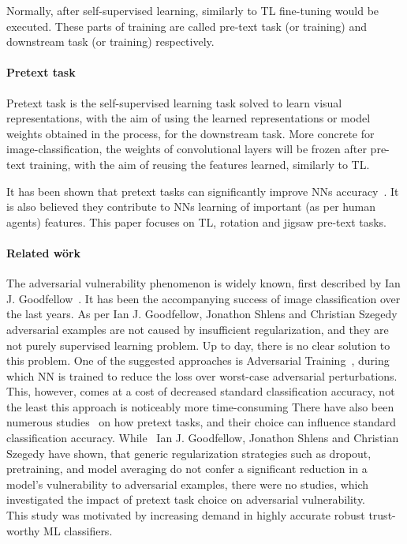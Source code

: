 Normally, after self-supervised learning, similarly to TL fine-tuning would be executed.
These parts of training are called pre-text task (or training) and downstream task (or training) respectively.

\paragraph{Pretext task}
Pretext task is the self-supervised learning task solved to learn visual representations,
with the aim of using the learned representations or model weights obtained in the process, for the downstream task.
More concrete for image-classification, the weights of convolutional layers will be frozen after pre-text training,
with the aim of reusing the features learned, similarly to TL.

It has been shown that pretext tasks can significantly improve NNs accuracy~\cite{kolesnikov2019revisiting}.
It is also believed they contribute to NNs learning of important (as per human agents) features.
This paper focuses on TL, rotation and jigsaw pre-text tasks.


\paragraph{Related wörk}
The adversarial vulnerability phenomenon is widely known, first described by Ian J. Goodfellow~\cite{goodfellow2015explaining}.
It has been the accompanying success of image classification over the last years.
As per Ian J. Goodfellow, Jonathon Shlens and Christian Szegedy~\cite{goodfellow2015explaining}
adversarial examples are not caused by insufficient regularization, and they are not purely supervised learning problem.
Up to day, there is no clear solution to this problem.
One of the suggested approaches is Adversarial Training~\cite{https://doi.org/10.48550/arxiv.1805.12152},
during which NN is trained to reduce the loss over worst-case adversarial perturbations.
This, however, comes at a cost of decreased standard classification accuracy, not the least this approach is noticeably more time-consuming
There have also been numerous studies~\cite{kolesnikov2019revisiting,DBLP:journals/corr/NorooziF16,DBLP:journals/corr/abs-1912-01991}
on how pretext tasks, and their choice can influence standard classification accuracy.
While~\cite{goodfellow2015explaining} Ian J. Goodfellow, Jonathon Shlens and Christian Szegedy have shown, that
generic regularization strategies such as dropout, pretraining, and model averaging do
not confer a significant reduction in a model’s vulnerability to adversarial examples,
there were no studies, which investigated the impact of pretext task choice on
adversarial vulnerability. \\
This study was motivated by increasing demand in highly accurate robust trust-worthy ML classifiers.




